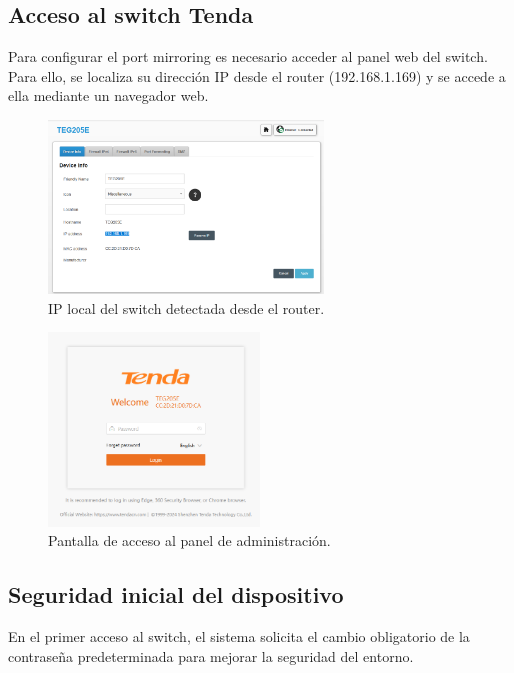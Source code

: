 \documentclass[11pt,a4paper,twoside]{report}
\begin{document}
\subsection*{Acceso al switch Tenda}

Para configurar el port mirroring es necesario acceder al panel web del switch. Para ello, se localiza su dirección IP desde el router (192.168.1.169) y se accede a ella mediante un navegador web.

\begin{figure}[H]
	\centering
	\includegraphics[width=0.65\textwidth]{pruebas_config/4-localizar_tenda.png}
	\caption{IP local del switch detectada desde el router.}
\end{figure}

\begin{figure}[H]
	\centering
	\includegraphics[width=0.5\textwidth]{pruebas_config/5-tenda_web.png}
	\caption{Pantalla de acceso al panel de administración.}
\end{figure}

\subsection*{Seguridad inicial del dispositivo}

En el primer acceso al switch, el sistema solicita el cambio obligatorio de la contraseña predeterminada para mejorar la seguridad del entorno.
\end{document}
